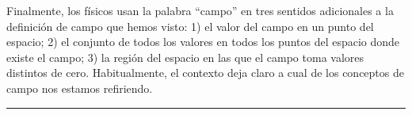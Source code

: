Finalmente, los físicos usan la palabra “campo” en tres sentidos adicionales a la definición de campo que hemos visto:
1) el valor del campo en un punto del espacio;
2) el conjunto de todos los valores en todos los puntos del espacio donde existe el campo;
3) la región del espacio en las que el campo toma valores distintos de cero.
Habitualmente, el contexto deja claro a cual de los conceptos de campo nos estamos refiriendo.

\vspace{-8mm}
\begin{flushright}
\rule{250pt}{0.2pt}		
\end{flushright}	
\color{black}
	

